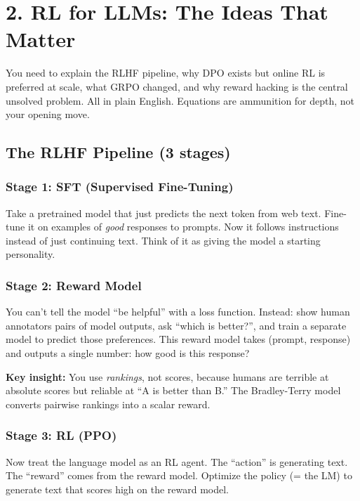 \section{2. RL for LLMs: The Ideas That Matter}

\begin{bluf}
You need to explain the RLHF pipeline, why DPO exists but online RL is preferred at scale, what GRPO changed, and why reward hacking is the central unsolved problem. All in plain English. Equations are ammunition for depth, not your opening move.
\end{bluf}

\subsection{The RLHF Pipeline (3 stages)}

\subsubsection{Stage 1: SFT (Supervised Fine-Tuning)} Take a pretrained model that just predicts the next token from web text. Fine-tune it on examples of \textit{good} responses to prompts. Now it follows instructions instead of just continuing text. Think of it as giving the model a starting personality.

\subsubsection{Stage 2: Reward Model} You can't tell the model ``be helpful'' with a loss function. Instead: show human annotators pairs of model outputs, ask ``which is better?'', and train a separate model to predict those preferences. This reward model takes (prompt, response) and outputs a single number: how good is this response?

\textbf{Key insight:} You use \textit{rankings}, not scores, because humans are terrible at absolute scores but reliable at ``A is better than B.'' The Bradley-Terry model converts pairwise rankings into a scalar reward.

\subsubsection{Stage 3: RL (PPO)} Now treat the language model as an RL agent. The ``action'' is generating text. The ``reward'' comes from the reward model. Optimize the policy (= the LM) to generate text that scores high on the reward model.

